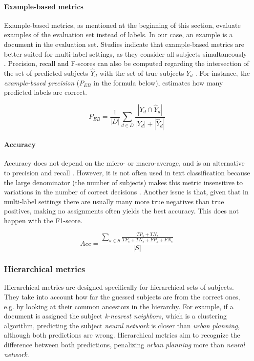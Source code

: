 \paragraph{Example-based metrics} \mbox{}

Example-based metrics, as mentioned at the beginning of this section, evaluate examples of the evaluation set instead of labels. In our case, an example is a document in the evaluation set. Studies indicate that example-based metrics are better suited for multi-label settings, as they consider all subjects simultaneously \cite{giraldo2015evaluation}. Precision, recall and F-scores can also be computed regarding the intersection of the set of predicted subjects $\hat{Y}_d$ with the set of true subjects $Y_d$ \cite{gargiulo2019deep}. For instance, the \textit{example-based precision} ($P_{EB}$ in the formula below), estimates how many predicted labels are correct.

$$ P_{EB} = \frac{1}{|D|} \sum_{d \in D} \frac{|Y_d \cap \hat{Y}_d|}{|Y_d| + |\hat{Y}_d|} $$

\paragraph{Accuracy} \mbox{}

Accuracy does not depend on the micro- or macro-average, and is an alternative to precision and recall \cite{gargiulo2019deep}. However, it is not often used in text classification because the large denominator (the number of subjects) makes this metric insensitive to variations in the number of correct decisions \cite{sebastianini2002machine}. Another issue is that, given that in multi-label settings there are usually many more true negatives than true positives, making no assignments often yields the best accuracy. This does not happen with the F1-score.

$$ Acc = \frac{\sum_{s \in S} \frac{TP_s + TN_s}{TP_s + TN_s + FP_s + FN_s}}{|S|} $$

\subsubsection{Hierarchical metrics} \label{eval_metrics_hierarchy}

Hierarchical metrics are designed specifically for hierarchical sets of subjects. They take into account how far the guessed subjects are from the correct ones, e.g. by looking at their common ancestors in the hierarchy. For example, if a document is assigned the subject \textit{k-nearest neighbors}, which is a clustering algorithm, predicting the subject \textit{neural network} is closer than \textit{urban planning}, although both predictions are wrong. Hierarchical metrics aim to recognize the difference between both predictions, penalizing \textit{urban planning} more than \textit{neural network}.

